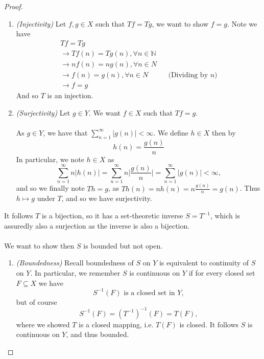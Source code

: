 \documentclass[12pt]{article}
\newcommand{\N}{\mathbb{N}}
\newenvironment{ex}[2][Exercise]{\begin{trivlist}
\item[\hskip \labelsep {\bfseries #1}\hskip \labelsep {\bfseries #2.}]}{\end{trivlist}}
\begin{document}
\begin{ex}{6}
\begin{enumerate}[label=(\alph*)]
\begin{proof}
            \begin{enumerate}[label=(\roman*)]
                \item \textit{(Injectivity)} Let $f, g \in X$ such that $Tf = Tg$, we want to show $f = g$. Note we have
                \begin{align*}
                    Tf = Tg \\
                    \rightarrow Tf(n) = Tg(n), \forall n \in \N \\
                    \rightarrow nf(n) = ng(n), \forall n \in N \\
                    \rightarrow f(n) = g(n), \forall n \in N && \text{(Dividing by }n) \\
                    \rightarrow f = g
                \end{align*}
                And so $T$ is an injection.
                \item \textit{(Surjectivity)} Let $g \in Y$. We want $f \in X$ such that $Tf = g$. \\ \\
                As $g \in Y$, we have that $\sum_{n = 1}^\infty |g(n)| < \infty$. We define $h \in X$ then by
                $$h(n) = \frac{g(n)}{n}$$
                In particular, we note $h \in X$ as 
                $$\sum_{n = 1}^\infty n|h(n)| = \sum_{n = 1}^\infty n \Big | \frac{g(n)}{n} \Big | = \sum_{n = 1}^\infty |g(n)| < \infty,$$
                and so we finally note $Th = g$, as $Th(n) = nh(n) = n\frac{g(n)}{n} = g(n)$. Thus $h \mapsto g$ under $T$, and so we have surjectivity.
            \end{enumerate}
            It follows $T$ is a bijection, so it has a set-theoretic inverse $S = T^{-1}$, which is assuredly also a surjection as the inverse is also a bijection. \\ \\ We want to show then $S$ is bounded but not open.
            \begin{enumerate}[label=(\roman*)]
                \item \textit{(Boundedness)} Recall boundedness of $S$ on $Y$ is equivalent to continuity of $S$ on $Y$. In particular, we remember $S$ is continuous on $Y$ if for every closed set $F \subseteq X$ we have
                $$S^{-1}(F) \text{ is a closed set in } Y,$$
                but of course
                $$S^{-1}(F) = (T^{-1})^{-1}(F) = T(F),$$
                where we showed $T$ is a closed mapping, i.e. $T(F)$ is closed. It follows $S$ is continuous on $Y$, and thus bounded.

\end{enumerate}
\end{proof}
\end{enumerate}
\end{ex}
\end{document}
